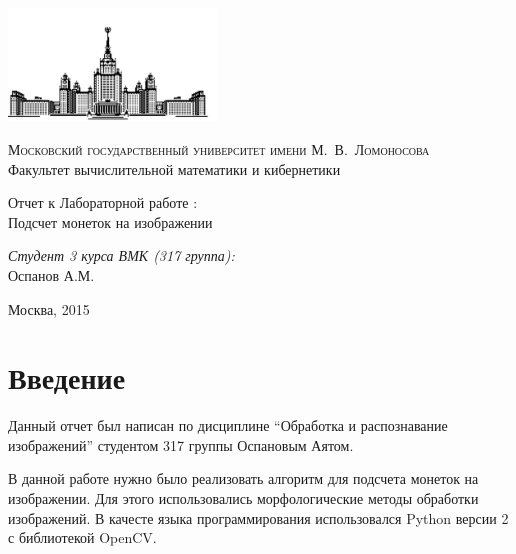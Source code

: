 \documentclass[12pt, a4paper]{article}
\begin{document}
	\thispagestyle{empty}

	\begin{singlespace}
	\begin{titlepage}
		\begin{center}
			\includegraphics[height = 3cm]{msu.png}

			{\scshape Московский государственный университет имени М.~В.~Ломоносова}\\
			Факультет вычислительной математики и кибернетики\\
			\centerline{\hfill\hrulefill\hrulefill\hrulefill\hrulefill\hfill}

			\vfill

			{\LARGE Отчет к Лабораторной работе : \\ Подсчет монеток на изображении}

			\vspace{1cm}

		\end{center}

		\vfill
		\begin{flushright}
			\textit{Студент 3 курса ВМК (317 группа):}\\
				Оспанов А.М.

			\vspace{5mm}

		\end{flushright}

		\vfill

		\begin{center}
		Москва, 2015
		\end{center}
	\end{titlepage}
	\end{singlespace}

	\tableofcontents

	\newpage
	\section{Введение}
		Данный отчет был написан по дисциплине ``Обработка и распознавание изображений'' студентом 317 группы Оспановым Аятом.

		В данной работе нужно было реализовать алгоритм для подсчета монеток на изображении. Для этого использовались морфологические методы обработки изображений. В качесте языка программирования использовался Python версии 2 с библиотекой OpenCV.
\end{document}
